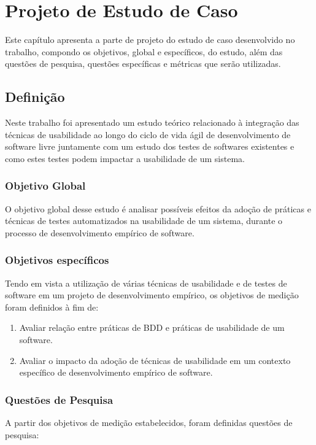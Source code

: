 \chapter{Projeto de Estudo de Caso}

Este capítulo apresenta a parte de projeto do estudo de caso desenvolvido no trabalho, compondo os objetivos, global e específicos, do estudo, além das questões de pesquisa, questões específicas e métricas que serão utilizadas.

\section{Definição}

Neste trabalho foi apresentado um estudo teórico relacionado à integração das técnicas de usabilidade ao longo do ciclo de vida ágil de desenvolvimento de software livre juntamente com um estudo dos testes de softwares existentes e como estes testes podem impactar a usabilidade de um sistema.

\subsection{Objetivo Global}

O objetivo global desse estudo é analisar possíveis efeitos da adoção de práticas e técnicas de testes automatizados na usabilidade de um sistema, durante o processo de desenvolvimento empírico de software.

\subsection{Objetivos específicos}

Tendo em vista a utilização de várias técnicas de usabilidade e de testes de software em um projeto de desenvolvimento empírico, os objetivos de medição foram definidos à fim de:

\begin{enumerate}
\item Avaliar relação entre práticas de BDD e práticas de usabilidade de um software. 

\item Avaliar o impacto da adoção de técnicas de usabilidade em um contexto específico de desenvolvimento empírico de software.
\end{enumerate}

\subsection{Questões de Pesquisa}
A partir dos objetivos de medição estabelecidos, foram definidas questões de pesquisa:

